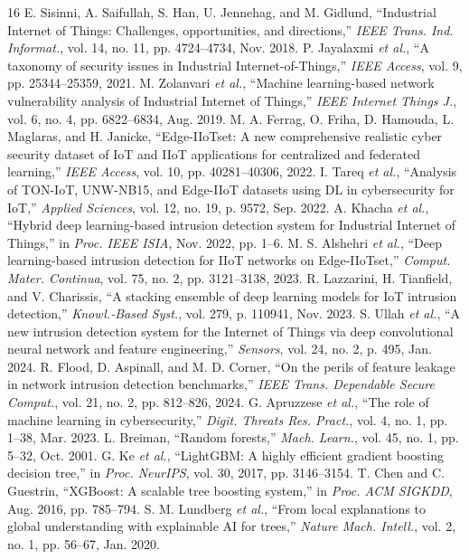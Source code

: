 \documentclass[conference]{IEEEtran}
\begin{document}
\begin{thebibliography}{16}
 E. Sisinni, A. Saifullah, S. Han, U. Jennehag, and M. Gidlund, ``Industrial Internet of Things: Challenges, opportunities, and directions,'' \textit{IEEE Trans. Ind. Informat.}, vol. 14, no. 11, pp. 4724--4734, Nov. 2018.
 P. Jayalaxmi \textit{et al.}, ``A taxonomy of security issues in Industrial Internet-of-Things,'' \textit{IEEE Access}, vol. 9, pp. 25344--25359, 2021.
 M. Zolanvari \textit{et al.}, ``Machine learning-based network vulnerability analysis of Industrial Internet of Things,'' \textit{IEEE Internet Things J.}, vol. 6, no. 4, pp. 6822--6834, Aug. 2019.
 M. A. Ferrag, O. Friha, D. Hamouda, L. Maglaras, and H. Janicke, ``Edge-IIoTset: A new comprehensive realistic cyber security dataset of IoT and IIoT applications for centralized and federated learning,'' \textit{IEEE Access}, vol. 10, pp. 40281--40306, 2022.
 I. Tareq \textit{et al.}, ``Analysis of TON-IoT, UNW-NB15, and Edge-IIoT datasets using DL in cybersecurity for IoT,'' \textit{Applied Sciences}, vol. 12, no. 19, p. 9572, Sep. 2022.
 A. Khacha \textit{et al.}, ``Hybrid deep learning-based intrusion detection system for Industrial Internet of Things,'' in \textit{Proc. IEEE ISIA}, Nov. 2022, pp. 1--6.
 M. S. Alshehri \textit{et al.}, ``Deep learning-based intrusion detection for IIoT networks on Edge-IIoTset,'' \textit{Comput. Mater. Continua}, vol. 75, no. 2, pp. 3121--3138, 2023.
 R. Lazzarini, H. Tianfield, and V. Charissis, ``A stacking ensemble of deep learning models for IoT intrusion detection,'' \textit{Knowl.-Based Syst.}, vol. 279, p. 110941, Nov. 2023.
 S. Ullah \textit{et al.}, ``A new intrusion detection system for the Internet of Things via deep convolutional neural network and feature engineering,'' \textit{Sensors}, vol. 24, no. 2, p. 495, Jan. 2024.
 R. Flood, D. Aspinall, and M. D. Corner, ``On the perils of feature leakage in network intrusion detection benchmarks,'' \textit{IEEE Trans. Dependable Secure Comput.}, vol. 21, no. 2, pp. 812--826, 2024.
 G. Apruzzese \textit{et al.}, ``The role of machine learning in cybersecurity,'' \textit{Digit. Threats Res. Pract.}, vol. 4, no. 1, pp. 1--38, Mar. 2023.
 L. Breiman, ``Random forests,'' \textit{Mach. Learn.}, vol. 45, no. 1, pp. 5--32, Oct. 2001.
 G. Ke \textit{et al.}, ``LightGBM: A highly efficient gradient boosting decision tree,'' in \textit{Proc. NeurIPS}, vol. 30, 2017, pp. 3146--3154.
 T. Chen and C. Guestrin, ``XGBoost: A scalable tree boosting system,'' in \textit{Proc. ACM SIGKDD}, Aug. 2016, pp. 785--794.
 S. M. Lundberg \textit{et al.}, ``From local explanations to global understanding with explainable AI for trees,'' \textit{Nature Mach. Intell.}, vol. 2, no. 1, pp. 56--67, Jan. 2020.
\end{thebibliography}
\end{document}
